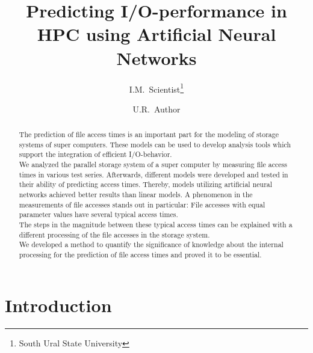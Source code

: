 \documentclass{superfri}
\begin{document}
\author{I.M.~Scientist\footnote{\label{susu}South Ural State University} \and U.R.~Author}

\title{Predicting I/O-performance in HPC using Artificial Neural Networks}

\maketitle{}

\begin{abstract} %
	
The prediction of file access times is an important part for the modeling of storage systems of super computers. These models can be used to develop analysis tools which support the integration of efficient I/O-behavior.\\
We analyzed the parallel storage system of a super computer by measuring file access times in various test series. Afterwards, different models were developed and tested in their ability of predicting access times. Thereby, models utilizing artificial neural networks achieved better results than linear models.
A phenomenon in the measurements of file accesses stands out in particular:
File accesses with equal parameter values have several typical access times.\\
The steps in the magnitude between these typical access times can be explained with a different processing of the file accesses in the storage system.\\
We developed a method to quantify the significance of knowledge about the internal processing for the prediction of file access times and proved it to be essential.

\end{abstract}

\section*{Introduction} %
\label{sec:intro}
\end{document}
